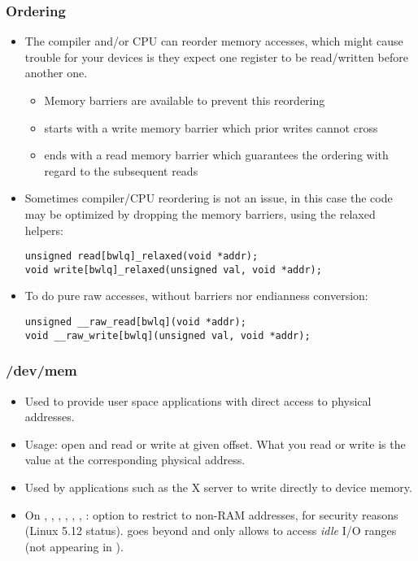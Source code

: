 \begin{frame}[fragile]
  \frametitle{Ordering}
  \begin{itemize}
  \item The compiler and/or CPU can reorder memory accesses, which
    might cause trouble for your devices is they expect one register
    to be read/written before another one.
    \begin{itemize}
    \item Memory barriers are available to prevent this reordering
    \item {} starts with a write memory barrier which
      prior writes cannot cross
    \item {} ends with a read memory barrier which
      guarantees the ordering with regard to the subsequent reads
    \end{itemize}
  \item Sometimes compiler/CPU reordering is not an issue, in this case
    the code may be optimized by dropping the memory barriers, using the
    relaxed helpers:
\begin{verbatim}
unsigned read[bwlq]_relaxed(void *addr);
void write[bwlq]_relaxed(unsigned val, void *addr);
\end{verbatim}
  \item To do pure raw accesses, without barriers nor endianness
    conversion:
\begin{verbatim}
unsigned __raw_read[bwlq](void *addr);
void __raw_write[bwlq](unsigned val, void *addr);
\end{verbatim}
  \end{itemize}
\end{frame}

\begin{frame}
  \frametitle{/dev/mem}
  \begin{itemize}
  \item Used to provide user space applications with direct access to
    physical addresses.
  \item Usage: open  and read or write at given offset.
    What you read or write is the value at the corresponding physical
    address.
  \item Used by applications such as the X server to write directly to
    device memory.
  \item On , , , ,
    , , :
     option to restrict 
    to non-RAM addresses, for security reasons (Linux 5.12 status).
     goes beyond and only allows to access
    {\em idle} I/O ranges (not appearing in ).
\end{itemize}
\end{frame}
